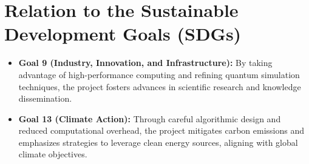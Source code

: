 \section{Relation to the Sustainable Development Goals (SDGs)}
\begin{itemize}
    \item \textbf{Goal 9 (Industry, Innovation, and Infrastructure):}  
    By taking advantage of high-performance computing and refining quantum simulation techniques, the project fosters advances in scientific research and knowledge dissemination.
    \item \textbf{Goal 13 (Climate Action):}  
    Through careful algorithmic design and reduced computational overhead, the project mitigates carbon emissions and emphasizes strategies to leverage clean energy sources, aligning with global climate objectives.
\end{itemize}